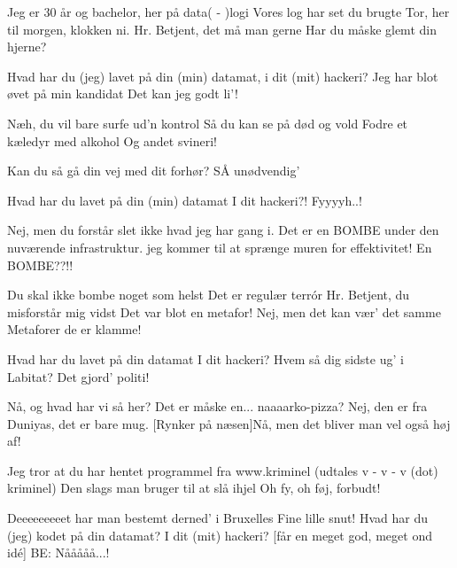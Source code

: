 \documentclass[a4paper,11pt]{article}
\begin{document}
\begin{song}
Jeg er 30 år og bachelor,
her på data( - )logi
Vores log har set du brugte Tor, 
her til morgen, klokken ni.   
Hr. Betjent, det må man gerne
Har du måske glemt din hjerne?
    
Hvad har du (jeg) lavet på din (min) datamat, 
i dit (mit) hackeri?
Jeg har blot øvet på min kandidat
Det kan jeg godt li'!
    
Næh, du vil bare surfe ud'n kontrol
Så du kan se på død og vold
Fodre et kæledyr med alkohol
Og andet svineri!
        
Kan du så gå din vej med dit forhør?
SÅ unødvendig' 

Hvad har du lavet på din (min) datamat
I dit hackeri?!
Fyyyyh..!
\end{song}
\begin{sketch}
Nej, men du forstår slet ikke hvad jeg har gang i. 
Det er en BOMBE under den nuværende infrastruktur.
jeg kommer til at sprænge muren for effektivitet!
En BOMBE??!!

\end{sketch}
\begin{song}
Du skal ikke bombe noget som helst
Det er regulær terrór
Hr. Betjent, du misforstår mig vidst
Det var blot en metafor!
Nej, men det kan vær' det samme
Metaforer de er klamme!

Hvad har du lavet på din datamat
I dit hackeri?
Hvem så dig sidste ug' i Labitat?
Det gjord' politi!
\end{song}
\begin{sketch}
Nå, og hvad har vi så her?
Det er måske en... naaaarko-pizza?
Nej, den er fra Duniyas, det er bare mug.
[Rynker på næsen]Nå, men det bliver man vel også høj af!
\end{sketch}
\begin{song}
  Jeg tror at du har hentet programmel 
  fra www.kriminel (udtales v - v - v (dot) kriminel)
  Den slags man bruger til at slå ihjel 
  Oh fy, oh føj, forbudt! 

  Deeeeeeeeet har man bestemt derned' i Bruxelles 
  Fine lille snut! 
  Hvad har du (jeg) kodet på din datamat? 
  I dit (mit) hackeri? 
  [får en meget god, meget ond idé]
BE: Nååååå...! 
\end{song}
\end{document}
